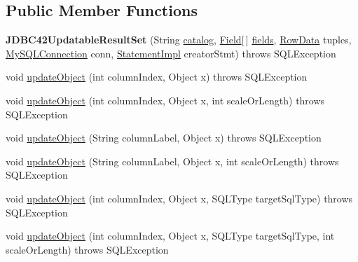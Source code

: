 \subsection*{Public Member Functions}
\begin{DoxyCompactItemize}
\item 
\mbox{\label{classcom_1_1mysql_1_1jdbc_1_1_j_d_b_c42_updatable_result_set_a66f420aabf88490c7af79969f1d4a2ea}} 
{\bfseries J\+D\+B\+C42\+Updatable\+Result\+Set} (String \mbox{\hyperlink{classcom_1_1mysql_1_1jdbc_1_1_result_set_impl_ae05d8a0ad69c96645b783537100fb95c}{catalog}}, \mbox{\hyperlink{classcom_1_1mysql_1_1jdbc_1_1_field}{Field}}\mbox{[}$\,$\mbox{]} \mbox{\hyperlink{classcom_1_1mysql_1_1jdbc_1_1_result_set_impl_a5da5c6ef8d035aa65884115a2f7daf67}{fields}}, \mbox{\hyperlink{interfacecom_1_1mysql_1_1jdbc_1_1_row_data}{Row\+Data}} tuples, \mbox{\hyperlink{interfacecom_1_1mysql_1_1jdbc_1_1_my_s_q_l_connection}{My\+S\+Q\+L\+Connection}} conn, \mbox{\hyperlink{classcom_1_1mysql_1_1jdbc_1_1_statement_impl}{Statement\+Impl}} creator\+Stmt)  throws S\+Q\+L\+Exception 
\item 
void \mbox{\hyperlink{classcom_1_1mysql_1_1jdbc_1_1_j_d_b_c42_updatable_result_set_a07c5b44cf69187e3a9aadf5300b91db4}{update\+Object}} (int column\+Index, Object x)  throws S\+Q\+L\+Exception 
\item 
void \mbox{\hyperlink{classcom_1_1mysql_1_1jdbc_1_1_j_d_b_c42_updatable_result_set_a44e9628e20751c663b4744390dfd0ddd}{update\+Object}} (int column\+Index, Object x, int scale\+Or\+Length)  throws S\+Q\+L\+Exception 
\item 
void \mbox{\hyperlink{classcom_1_1mysql_1_1jdbc_1_1_j_d_b_c42_updatable_result_set_ae9033d68579c6ac595f40f7a42fed8ed}{update\+Object}} (String column\+Label, Object x)  throws S\+Q\+L\+Exception 
\item 
void \mbox{\hyperlink{classcom_1_1mysql_1_1jdbc_1_1_j_d_b_c42_updatable_result_set_a6097b1af95f4724899f3e017e454478e}{update\+Object}} (String column\+Label, Object x, int scale\+Or\+Length)  throws S\+Q\+L\+Exception 
\item 
void \mbox{\hyperlink{classcom_1_1mysql_1_1jdbc_1_1_j_d_b_c42_updatable_result_set_a784df1d4773edd908afa6070b9f04919}{update\+Object}} (int column\+Index, Object x, S\+Q\+L\+Type target\+Sql\+Type)  throws S\+Q\+L\+Exception 
\item 
void \mbox{\hyperlink{classcom_1_1mysql_1_1jdbc_1_1_j_d_b_c42_updatable_result_set_aac836df6a26eb9856f36e5af642b655c}{update\+Object}} (int column\+Index, Object x, S\+Q\+L\+Type target\+Sql\+Type, int scale\+Or\+Length)  throws S\+Q\+L\+Exception 

\end{DoxyCompactItemize}
